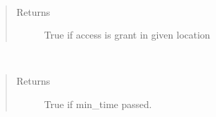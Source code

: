 \documentclass[letterpaper,10pt,english]{sphinxmanual}
\begin{document}
\begin{fulllineitems}

\begin{fulllineitems}
\label{\detokenize{doc/Access/AccesAfterTime:AccesAfterTime.AccessAfterTime.access_in_location}}~\begin{quote}\begin{description}
\item[{Returns}] \leavevmode
True if access is grant in given location

\end{description}\end{quote}

\end{fulllineitems}


\begin{fulllineitems}
\label{\detokenize{doc/Access/AccesAfterTime:AccesAfterTime.AccessAfterTime.check_time}}~\begin{quote}\begin{description}
\item[{Returns}] \leavevmode
True if min\_time passed.

\end{description}\end{quote}

\end{fulllineitems}



\end{fulllineitems}
\end{document}
